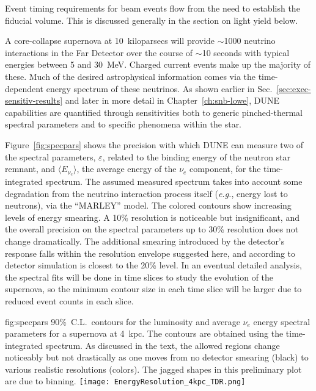 Event timing requirements for beam events flow from the
need to establish the fiducial volume.  This is discussed
generally in the section on light yield below.

  A core-collapse
supernova at 10~kiloparsecs will provide $\sim$1000 neutrino
interactions in the Far Detector over the course of
$\sim$10 seconds with typical energies between 5 and 30~MeV.
Charged current \nue{} events make up the majority of these.
Much of the desired astrophysical information comes via the
time-dependent energy spectrum of these neutrinos.  As shown
earlier in Sec.~\ref{sec:exec-sensitiv-results} and later
in more detail in Chapter~\ref{ch:snb-lowe},
DUNE capabilities are quantified through sensitivities
both to generic pinched-thermal spectral parameters 
and to
specific phenomena within the star.

Figure~\ref{fig:specpars} shows the precision with which DUNE
can measure two of the spectral parameters, $\varepsilon$, related to
the binding energy of the neutron star remnant, and $\langle
E_{\nu_e}\rangle$, the average energy of the $\nu_e$ component, for the
time-integrated spectrum.
The assumed measured spectrum takes into account some degradation
from the neutrino interaction process itself 
({\em e.g.}, energy lost to neutrons), via the ``MARLEY'' model.
The colored contours show increasing levels of energy smearing.
A 10\% resolution is noticeable but insignificant, and the
overall precision on the spectral parameters up to 30\%
resolution does not change dramatically.
The additional smearing introduced by the detector's response
falls within the resolution envelope suggested here, and according to
detector simulation is closest to the 20\% level.
In an eventual detailed analysis, the spectral
fits will be done in time slices to study the evolution of
the supernova, so the minimum contour size in each time slice
will be larger due to reduced event counts in each slice.

\begin{dunefigure}
{fig:specpars}
{90\%~C.L.\ contours for the luminosity and average $\nu_e$ energy
spectral parameters for a supernova
at 4~kpc.  The contours are obtained using the time-integrated
spectrum.  As discussed in the text, the allowed regions
change noticeably but not drastically as one moves from
no detector smearing (black) to various realistic resolutions (colors).
The jagged shapes in this preliminary plot are due to binning.}
  \texttt{[image: EnergyResolution\_4kpc\_TDR.png]}
\end{dunefigure}

